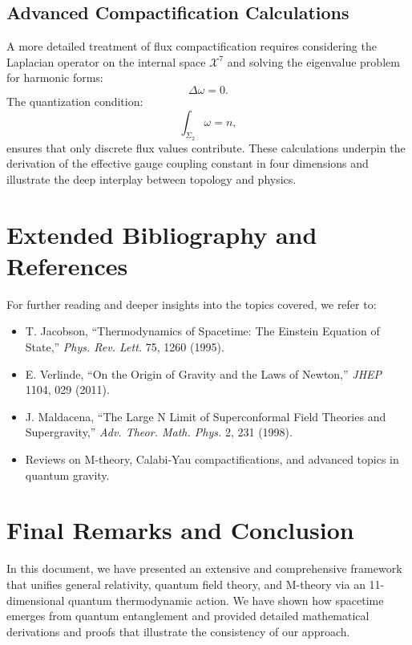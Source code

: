 \documentclass[12pt, a4paper]{article}
\begin{document}
\subsection{Advanced Compactification Calculations}
A more detailed treatment of flux compactification requires considering the Laplacian operator on the internal space \(\mathcal{X}^7\) and solving the eigenvalue problem for harmonic forms:
\begin{equation}
    \Delta \omega = 0.
\end{equation}
The quantization condition:
\begin{equation}
    \int_{\Sigma_2} \omega = n,
\end{equation}
ensures that only discrete flux values contribute. These calculations underpin the derivation of the effective gauge coupling constant in four dimensions and illustrate the deep interplay between topology and physics.

\section{Extended Bibliography and References}
For further reading and deeper insights into the topics covered, we refer to:
\begin{itemize}
    \item T. Jacobson, ``Thermodynamics of Spacetime: The Einstein Equation of State,'' \emph{Phys. Rev. Lett.} 75, 1260 (1995).
    \item E. Verlinde, ``On the Origin of Gravity and the Laws of Newton,'' \emph{JHEP} 1104, 029 (2011).
    \item J. Maldacena, ``The Large N Limit of Superconformal Field Theories and Supergravity,'' \emph{Adv. Theor. Math. Phys.} 2, 231 (1998).
    \item Reviews on M-theory, Calabi-Yau compactifications, and advanced topics in quantum gravity.
\end{itemize}

\section*{Final Remarks and Conclusion}
In this document, we have presented an extensive and comprehensive framework that unifies general relativity, quantum field theory, and M-theory via an 11-dimensional quantum thermodynamic action. We have shown how spacetime emerges from quantum entanglement and provided detailed mathematical derivations and proofs that illustrate the consistency of our approach.
\end{document}

